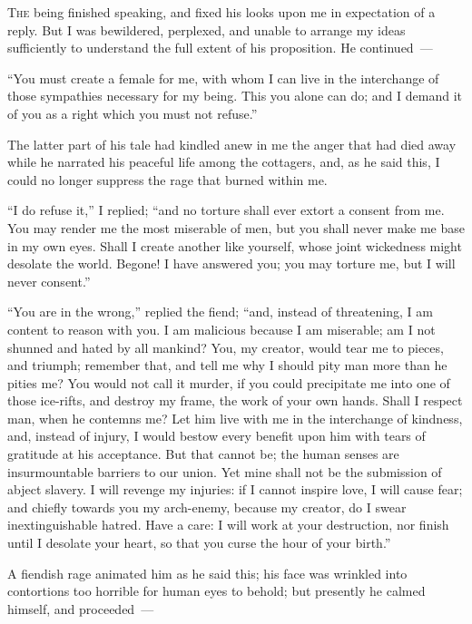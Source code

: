 
\textsc{The} being finished speaking, and
fixed his looks upon me in expectation
of a reply. But I was bewildered,
perplexed, and unable to arrange my
ideas sufficiently to understand the full
extent of his proposition. He continued~---

``You must create a female for me,
with whom I can live in the interchange
of those sympathies necessary
for my being. This you alone can do;
and I demand it of you as a right which
you must not refuse.''

The latter part of his tale had kindled
anew in me the anger that had
died away while he narrated his peaceful
life among the cottagers, and, as he
said this, I could no longer suppress
the rage that burned within me.

``I do refuse it,'' I replied; ``and no
torture shall ever extort a consent from
me. You may render me the most
miserable of men, but you shall never
make me base in my own eyes. Shall
I create another like yourself, whose
joint wickedness might desolate the
world. Begone! I have answered you;
you may torture me, but I will never
consent.''

``You are in the wrong,'' replied the
fiend; ``and, instead of threatening, I
am content to reason with you. I am
malicious because I am miserable; am
I not shunned and hated by all mankind?
You, my creator, would tear me
to pieces, and triumph; remember that,
and tell me why I should pity man
more than he pities me? You would
not call it murder, if you could precipitate
me into one of those ice-rifts, and
destroy my frame, the work of your
own hands. Shall I respect man, when
he contemns me? Let him live with
me in the interchange of kindness, and,
instead of injury, I would bestow every
benefit upon him with tears of gratitude
at his acceptance. But that cannot
be; the human senses are insurmountable
barriers to our union. Yet
mine shall not be the submission of
abject slavery. I will revenge my injuries:
if I cannot inspire love, I will
cause fear; and chiefly towards you
my arch-enemy, because my creator, do
I swear inextinguishable hatred. Have
a care: I will work at your destruction,
nor finish until I desolate your
heart, so that you curse the hour of
your birth.''

A fiendish rage animated him as he
said this; his face was wrinkled into
contortions too horrible for human eyes
to behold; but presently he calmed
himself, and proceeded~---

